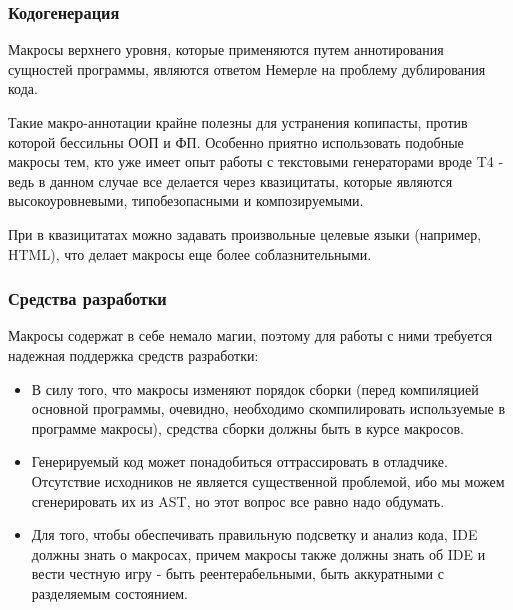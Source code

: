 \documentclass[hyperref={bookmarks=false}]{beamer}
\begin{document}
\begin{frame}[t]
\frametitle{Кодогенерация}

Макросы верхнего уровня, которые применяются путем аннотирования сущностей программы, являются ответом Немерле на проблему дублирования кода.

Такие макро-аннотации крайне полезны для устранения копипасты, против которой бессильны ООП и ФП. Особенно приятно использовать подобные макросы тем, кто уже имеет опыт работы с текстовыми генераторами вроде T4 - ведь в данном случае все делается через квазицитаты, которые являются высокоуровневыми, типобезопасными и композируемыми.

При  в квазицитатах можно задавать произвольные целевые языки (например, HTML), что делает макросы еще более соблазнительными.
\end{frame}

\begin{frame}[t]
\frametitle{Средства разработки}

Макросы содержат в себе немало магии, поэтому для работы с ними требуется надежная поддержка средств разработки:

\begin{itemize}
\item В силу того, что макросы изменяют порядок сборки (перед компиляцией основной программы, очевидно, необходимо скомпилировать используемые в программе макросы), средства сборки должны быть в курсе макросов.
\item Генерируемый код может понадобиться оттрассировать в отладчике. Отсутствие исходников не является существенной проблемой, ибо мы можем сгенерировать их из AST, но этот вопрос все равно надо обдумать.
\item Для того, чтобы обеспечивать правильную подсветку и анализ кода, IDE должны знать о макросах, причем макросы также должны знать об IDE и вести честную игру - быть реентерабельными, быть аккуратными с разделяемым состоянием.
\end{itemize}
\end{frame}
\end{document}
